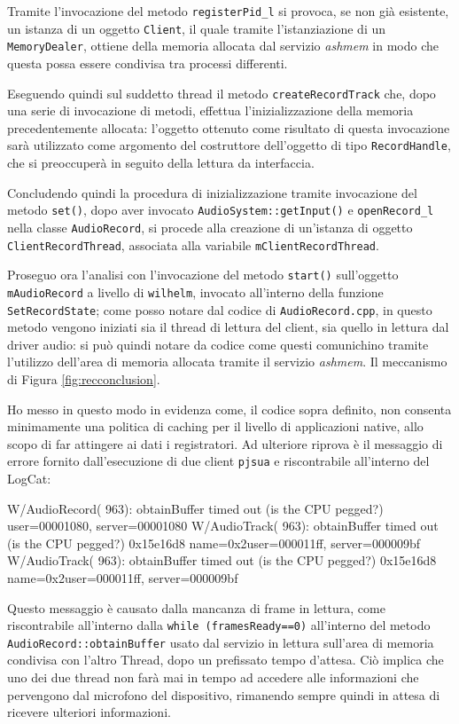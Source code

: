 Tramite l'invocazione del metodo \texttt{\small registerPid\_l} si provoca, se non
già esistente, un istanza di un oggetto \texttt{\small Client}, il quale tramite
l'istanziazione di un \texttt{\small MemoryDealer}, ottiene della memoria allocata
dal servizio \textit{ashmem} in modo che questa possa essere condivisa tra processi
differenti.

Eseguendo quindi sul suddetto thread il metodo \texttt{\small createRecordTrack} che,
dopo una serie di invocazione di metodi, effettua l'inizializzazione della
memoria precedentemente allocata: l'oggetto ottenuto come risultato di questa
invocazione sarà utilizzato come argomento del costruttore dell'oggetto di
tipo \texttt{\small RecordHandle}, che si preoccuperà in seguito della lettura da
interfaccia.


Concludendo quindi la procedura di inizializzazione tramite invocazione del 
metodo \texttt{\small set()}, dopo aver invocato \texttt{\small AudioSystem::getInput()}
e \texttt{\small openRecord\_l} nella classe \texttt{\small AudioRecord}, si procede
alla creazione di un'istanza di oggetto \texttt{\small ClientRecordThread},
associata alla variabile \texttt{\small mClientRecordThread}.
\bigskip

Proseguo ora l'analisi con l'invocazione del metodo \texttt{\small start()} 
sull'oggetto \texttt{mAudioRecord} a livello di \texttt{\small wilhelm}, invocato
all'interno della funzione \texttt{\small SetRecordState}; come posso notare
dal codice di \texttt{\small AudioRecord.cpp}, in questo metodo vengono iniziati
sia il thread di lettura del client, sia quello in lettura dal driver audio:
si può quindi notare da codice come questi comunichino tramite l'utilizzo
dell'area di memoria allocata tramite il servizio \textit{ashmem}. Il meccanismo
di Figura  \vref{fig:recconclusion}.

Ho messo in questo modo in evidenza come, il codice sopra definito, non consenta
minimamente una politica di caching per il livello di
applicazioni native, allo scopo di far attingere ai dati i 
registratori. Ad ulteriore riprova è il messaggio di errore fornito dall'esecuzione
di due client \texttt{\small pjsua} e riscontrabile all'interno del LogCat:
\begin{bash}
W/AudioRecord(  963): obtainBuffer timed out (is the CPU pegged?) user=00001080, server=00001080
W/AudioTrack(  963): obtainBuffer timed out (is the CPU pegged?) 0x15e16d8 name=0x2user=000011ff, server=000009bf
W/AudioTrack(  963): obtainBuffer timed out (is the CPU pegged?) 0x15e16d8 name=0x2user=000011ff, server=000009bf
\end{bash}
Questo messaggio è causato dalla mancanza di frame in lettura, come riscontrabile
all'interno dalla \texttt{\small while (framesReady==0)} all'interno del metodo\\
\texttt{\small AudioRecord::obtainBuffer} usato dal servizio in lettura sull'area
di memoria condivisa con l'altro Thread, dopo un prefissato tempo d'attesa. Ciò implica che uno dei due thread non
farà mai in tempo ad accedere alle informazioni che pervengono dal microfono
del dispositivo, rimanendo sempre quindi in attesa di ricevere ulteriori informazioni.

